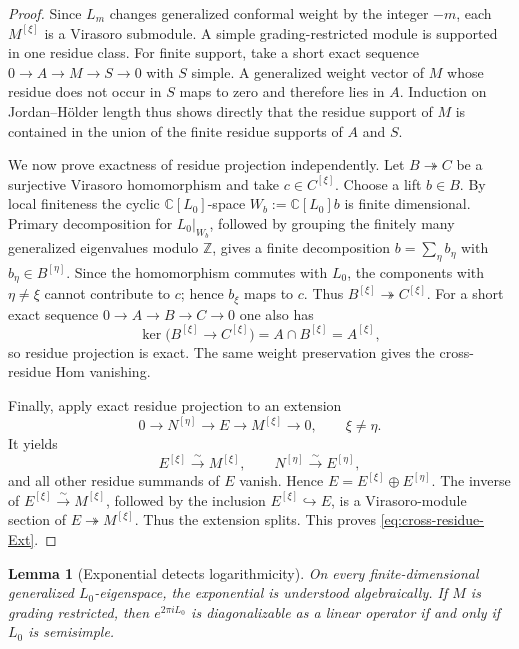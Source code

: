 \documentclass[12pt,leqno]{amsart}
\numberwithin{equation}{section}
\newtheorem{lem}[thm]{Lemma}
\def\Z{\mathbb{Z}}
\def\C{\mathbb{C}}
\begin{document}
\begin{proof}
Since $L_m$ changes generalized conformal weight by the integer $-m$, each
$M^{[\xi]}$ is a Virasoro submodule.  A simple grading-restricted module is supported in one residue class.
For finite support, take a short exact sequence
$0\to A\to M\to S\to0$ with $S$ simple.  A generalized weight vector of
$M$ whose residue does not occur in $S$ maps to zero and therefore lies in
$A$.  Induction on Jordan--H\"older length thus shows directly that the
residue support of $M$ is contained in the union of the finite residue
supports of $A$ and $S$.

We now prove exactness of residue projection independently.  Let
$B\twoheadrightarrow C$ be a surjective Virasoro homomorphism and take
$c\in C^{[\xi]}$.  Choose a lift $b\in B$.  By local finiteness the cyclic
$\C[L_0]$-space $W_b:=\C[L_0]b$ is finite dimensional.  Primary
decomposition for $L_0|_{W_b}$, followed by grouping the finitely many
generalized eigenvalues modulo $\Z$, gives a finite decomposition
$b=\sum_\eta b_\eta$ with $b_\eta\in B^{[\eta]}$.  Since the
homomorphism commutes with $L_0$,
the components with $\eta\neq\xi$ cannot contribute to $c$; hence
$b_\xi$ maps to $c$.  Thus $B^{[\xi]}\twoheadrightarrow C^{[\xi]}$.  For a short exact
sequence $0\to A\to B\to C\to0$ one also has
\[
 \ker\bigl(B^{[\xi]}\to C^{[\xi]}\bigr)
 =A\cap B^{[\xi]}=A^{[\xi]},
\]
so residue projection is exact.  The same weight preservation gives the
cross-residue Hom vanishing.

Finally, apply exact residue projection to an extension
\[
 0\longrightarrow N^{[\eta]}\longrightarrow E\longrightarrow
 M^{[\xi]}\longrightarrow0,\qquad \xi\neq\eta .
\]
It yields
\[
 E^{[\xi]}\xrightarrow{\sim}M^{[\xi]},\qquad
 N^{[\eta]}\xrightarrow{\sim}E^{[\eta]},
\]
and all other residue summands of $E$ vanish.  Hence
$E=E^{[\xi]}\oplus E^{[\eta]}$.  The inverse of
$E^{[\xi]}\xrightarrow{\sim}M^{[\xi]}$, followed by the inclusion
$E^{[\xi]}\hookrightarrow E$, is a Virasoro-module section of
$E\twoheadrightarrow M^{[\xi]}$.  Thus the extension splits.  This proves
\eqref{eq:cross-residue-Ext}.
\end{proof}

\begin{lem}[Exponential detects logarithmicity]\label{lem:exponential-logarithmic}
On every finite-dimensional generalized $L_0$-eigenspace, the exponential
is understood algebraically.  If $M$ is grading restricted, then
$e^{2\pi iL_0}$ is diagonalizable as a linear operator if and only if
$L_0$ is semisimple.
\end{lem}
\end{document}
